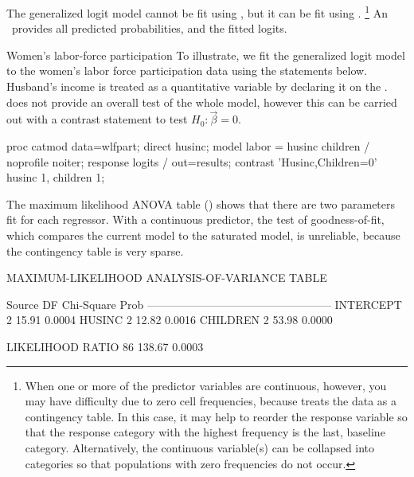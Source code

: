 The generalized logit model cannot be fit using ,
but it can be fit using .%
\footnote{When one or more of the predictor variables are continuous,
however, you may have difficulty due to zero cell
frequencies, because  treats the data
as a contingency table.  In this case, it may help to reorder
the response variable so that the response category with the highest
frequency is the last, baseline category.
Alternatively, the continuous variable(s) can be collapsed into
categories so that populations with zero frequencies do not occur.}
An \ODS\ provides all predicted probabilities, and
the fitted logits.

\begin{Example}[wlfpart2]{Women's labor-force participation}
To illustrate, we fit the generalized logit model to the
women's labor force participation data using the statements
below.
Husband's income is treated as a quantitative variable
by declaring it on the .
 does not provide an overall test of the
whole model, however this can be carried out with a contrast
statement to test $H_0: \vec{\beta} = 0$.
\begin{listing}
proc catmod data=wlfpart;
   direct husinc;
   model labor = husinc children / noprofile noiter;
   response logits / out=results;
   contrast 'Husinc,Children=0'
      husinc   1,
      children 1;
\end{listing}

The maximum likelihood ANOVA table () shows that there are
two parameters fit for each regressor.
With a continuous predictor, the \LR{} test
of goodness-of-fit, which compares the current model to
the saturated model, is unreliable, because the contingency
table is very sparse.
\begin{Output}[htb]
\caption{Women's labor-force data, generalized logit model tests}\label{out:wlfpart3.1}
\small
\begin{output}
            MAXIMUM-LIKELIHOOD ANALYSIS-OF-VARIANCE TABLE

         Source                   DF   Chi-Square      Prob
         --------------------------------------------------
         INTERCEPT                 2        15.91    0.0004
         HUSINC                    2        12.82    0.0016
         CHILDREN                  2        53.98    0.0000

         LIKELIHOOD RATIO         86       138.67    0.0003
\end{output}
\end{Output}


\end{Example}
